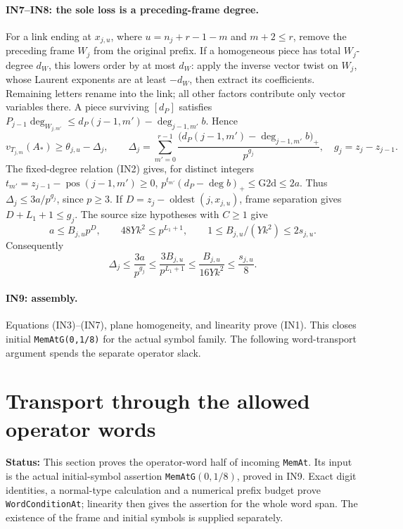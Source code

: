 \documentclass[11pt,a4paper]{article}
\numberwithin{equation}{section}
\theoremstyle{remark}\newtheorem{remark}[theorem]{Remark}
\newcommand{\status}[1]{\textbf{Status:} #1}
\begin{document}
\paragraph{IN7--IN8: the sole loss is a preceding-frame degree.}
For a link ending at $x_{j,u}$, where $u=n_j+r-1-m$ and $m+2\leq r$,
remove the preceding frame $W_j$ from the original prefix.  If a
homogeneous piece has total $W_j$-degree $d_W$, this lowers order by
at most $d_W$: apply the inverse vector twist on $W_j$, whose Laurent
exponents are at least $-d_W$, then extract its coefficients.
Remaining letters rename into the link; all other factors contribute
only vector variables there.  A piece surviving $[d_P]$ satisfies
$P_{j-1}\deg_{W_{j,m'}}\leq d_P(j-1,m')-\deg_{j-1,m'}b$.  Hence
\[
 v_{T_{j,m}}(A_*)\geq\theta_{j,u}-\Delta_j,\qquad
 \Delta_j=\sum_{m'=0}^{r-1}
 \frac{\bigl(d_P(j-1,m')-\deg_{j-1,m'}b\bigr)_+}{p^{g_j}},
 \quad g_j=z_j-z_{j-1}.
 \tag{IN6}
\]
The fixed-degree relation (IN2) gives, for distinct integers
$t_{m'}=z_{j-1}-\operatorname{pos}(j-1,m')\geq0$,
$p^{t_{m'}}(d_P-\deg b)_+\leq\mathrm{G2d}\leq2a$.
Thus $\Delta_j\leq3a/p^{g_j}$, since $p\geq3$.
If $D=z_j-\operatorname{oldest}(j,x_{j,u})$, frame separation gives
$D+L_1+1\leq g_j$.  The source size hypotheses with $C\geq1$ give
\[
 a\leq B_{j,u}p^D,\qquad 48Yk^2\leq p^{L_1+1},\qquad
 1\leq B_{j,u}/(Yk^2)\leq2s_{j,u}.
\]
Consequently
\[
 \Delta_j\leq\frac{3a}{p^{g_j}}
 \leq\frac{3B_{j,u}}{p^{L_1+1}}
 \leq\frac{B_{j,u}}{16Yk^2}\leq\frac{s_{j,u}}8.
 \tag{IN7}
\]

\paragraph{IN9: assembly.}
Equations (IN3)--(IN7), plane homogeneity, and linearity prove (IN1).
This closes initial \texttt{MemAtG(0,1/8)} for the actual symbol family.
The following word-transport argument spends the separate operator slack.

\section{Transport through the allowed operator words}
\label{sec:word-transport}

\status{This section proves the operator-word half of incoming \texttt{MemAt}. Its input is the actual initial-symbol assertion \texttt{MemAtG}$(0,1/8)$, proved in IN9. Exact digit identities, a normal-type calculation and a numerical prefix budget prove \texttt{WordConditionAt}; linearity then gives the assertion for the whole word span. The existence of the frame and initial symbols is supplied separately.}
\end{document}
